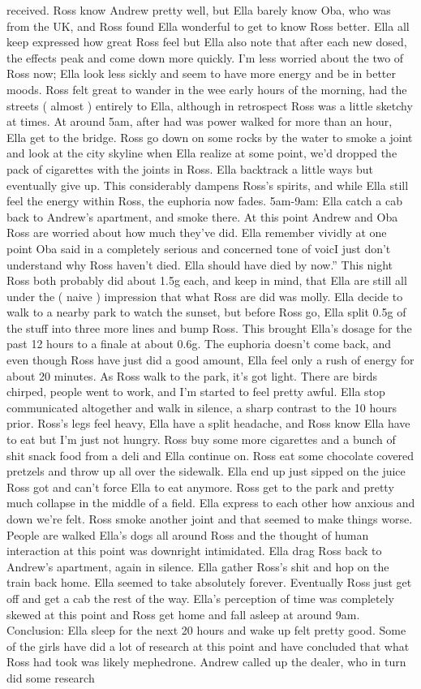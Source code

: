 \documentclass[12pt]{book}
\begin{document}
received. Ross know Andrew pretty well, but Ella barely know Oba, who was from the UK, and Ross found Ella wonderful to get to know Ross better. Ella all keep expressed how great Ross feel but Ella also note that after each new dosed, the effects peak and come down more quickly. I'm less worried about the two of Ross now; Ella look less sickly and seem to have more energy and be in better moods. Ross felt great to wander in the wee early hours of the morning, had the streets ( almost ) entirely to Ella, although in retrospect Ross was a little sketchy at times. At around 5am, after had was power walked for more than an hour, Ella get to the bridge. Ross go down on some rocks by the water to smoke a joint and look at the city skyline when Ella realize at some point, we'd dropped the pack of cigarettes with the joints in Ross. Ella backtrack a little ways but eventually give up. This considerably dampens Ross's spirits, and while Ella still feel the energy within Ross, the euphoria now fades. 5am-9am: Ella catch a cab back to Andrew's apartment, and smoke there. At this point Andrew and Oba Ross are worried about how much they've did. Ella remember vividly at one point Oba said in a completely serious and concerned tone of voicI just don't understand why Ross haven't died. Ella should have died by now.'' This night Ross both probably did about 1.5g each, and keep in mind, that Ella are still all under the ( naive ) impression that what Ross are did was molly. Ella decide to walk to a nearby park to watch the sunset, but before Ross go, Ella split 0.5g of the stuff into three more lines and bump Ross. This brought Ella's dosage for the past 12 hours to a finale at about 0.6g. The euphoria doesn't come back, and even though Ross have just did a good amount, Ella feel only a rush of energy for about 20 minutes. As Ross walk to the park, it's got light. There are birds chirped, people went to work, and I'm started to feel pretty awful. Ella stop communicated altogether and walk in silence, a sharp contrast to the 10 hours prior. Ross's legs feel heavy, Ella have a split headache, and Ross know Ella have to eat but I'm just not hungry. Ross buy some more cigarettes and a bunch of shit snack food from a deli and Ella continue on. Ross eat some chocolate covered pretzels and throw up all over the sidewalk. Ella end up just sipped on the juice Ross got and can't force Ella to eat anymore. Ross get to the park and pretty much collapse in the middle of a field. Ella express to each other how anxious and down we're felt. Ross smoke another joint and that seemed to make things worse. People are walked Ella's dogs all around Ross and the thought of human interaction at this point was downright intimidated. Ella drag Ross back to Andrew's apartment, again in silence. Ella gather Ross's shit and hop on the train back home. Ella seemed to take absolutely forever. Eventually Ross just get off and get a cab the rest of the way. Ella's perception of time was completely skewed at this point and Ross get home and fall asleep at around 9am. Conclusion: Ella sleep for the next 20 hours and wake up felt pretty good. Some of the girls have did a lot of research at this point and have concluded that what Ross had took was likely mephedrone. Andrew called up the dealer, who in turn did some research 
\end{document}
